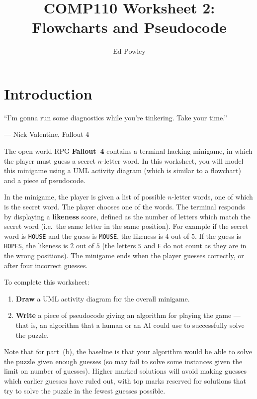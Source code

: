 \documentclass{../../../fal_assignment}
\title{COMP110 Worksheet 2: Flowcharts and Pseudocode}
\author{Ed Powley}
\begin{document}
\maketitle

\section*{Introduction}

\begin{marginquote}
``I'm gonna run some diagnostics while you're tinkering. Take your time.''

--- Nick Valentine, Fallout 4
\end{marginquote}

The open-world RPG \textbf{Fallout~4} contains a terminal hacking minigame, in which
the player must guess a secret $n$-letter word.
In this worksheet, you will model this minigame using a UML activity diagram (which is similar to a flowchart) and a piece of pseudocode.

In the minigame, the player is given a list of possible $n$-letter words, one of which is the secret word.
The player chooses one of the words.
The terminal responds by displaying a \textbf{likeness} score,
defined as the number of letters which match the secret word (i.e.\ the same letter in the same position).
For example if the secret word is \texttt{HOUSE} and the guess is \texttt{MOUSE}, the likeness is $4$ out of $5$.
If the guess is \texttt{HOPES}, the likeness is $2$ out of $5$
(the letters \texttt{S} and \texttt{E} do not count as they are in the wrong positions).
The minigame ends when the player guesses correctly, or after four incorrect guesses.

To complete this worksheet:
\begin{enumerate}[label=(\alph*)]
	\item \textbf{Draw} a UML activity diagram for the overall minigame.
	\item \textbf{Write} a piece of pseudocode giving an algorithm for playing the game
		--- that is, an algorithm that a human or an AI could use to successfully solve the puzzle.
\end{enumerate}

Note that for part~(b), the baseline is that your algorithm would be able to solve the puzzle given enough guesses (so may fail to solve some instances given the limit on number of guesses).
Higher marked solutions will avoid making guesses which earlier guesses have ruled out,
with top marks reserved for solutions that try to solve the puzzle in the fewest guesses possible.
\end{document}
